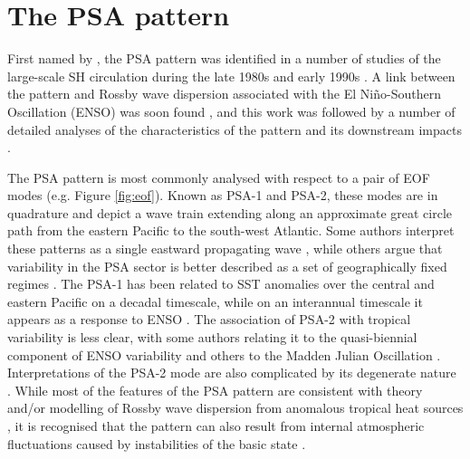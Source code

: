 
\section{The PSA pattern}\label{s:psa_overview}

First named by \citet{Mo1987}, the PSA pattern was identified in a number of studies of the large-scale SH circulation during the late 1980s and early 1990s \citep[e.g.][]{Kidson1988,Ghil1991,Lau1994}. A link between the pattern and Rossby wave dispersion associated with the El Ni\~{n}o-Southern Oscillation (ENSO) was soon found \citep[e.g.][]{Karoly1989}, and this work was followed by a number of detailed analyses of the characteristics of the pattern and its downstream impacts \citep[e.g.][]{Mo1998,Mo2000,Mo2001}.

The PSA pattern is most commonly analysed with respect to a pair of EOF modes (e.g. Figure \ref{fig:eof}). Known as PSA-1 and PSA-2, these modes are in quadrature and depict a wave train extending along an approximate great circle path from the eastern Pacific to the south-west Atlantic. Some authors interpret these patterns as a single eastward propagating wave \citep{Mo1998}, while others argue that variability in the PSA sector is better described as a set of geographically fixed regimes \citep{Robertson2003}. The PSA-1 has been related to SST anomalies over the central and eastern Pacific on a decadal timescale, while on an interannual timescale it appears as a response to ENSO \citep{Mo2001}. The association of PSA-2 with tropical variability is less clear, with some authors relating it to the quasi-biennial component of ENSO variability \citep{Mo2000} and others to the Madden Julian Oscillation \citep{Renwick1999}. Interpretations of the PSA-2 mode are also complicated by its degenerate \citep{North1982} nature \citep[e.g. Figure 1;][]{Mo2000}. While most of the features of the PSA pattern are consistent with theory and/or modelling of Rossby wave dispersion from anomalous tropical heat sources \citep[e.g.][]{Liu2007,Li2015}, it is recognised that the pattern can also result from internal atmospheric fluctuations caused by instabilities of the basic state \citep[and that both mechanisms likely act in concert; e.g.][]{Grimm2009}.

